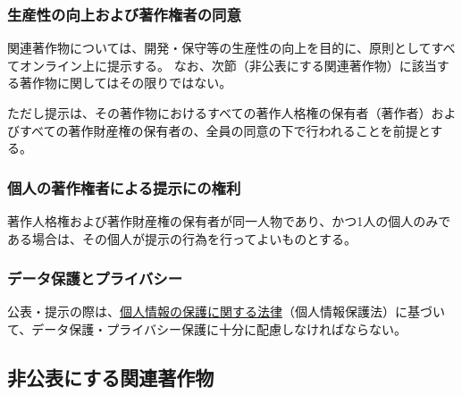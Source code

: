 \subsubsection{生産性の向上および著作権者の同意}
関連著作物については、開発・保守等の生産性の向上を目的に、原則としてすべてオンライン上に提示する。
なお、次節（非公表にする関連著作物）に該当する著作物に関してはその限りではない。

ただし提示は、その著作物におけるすべての著作人格権の保有者（著作者）およびすべての著作財産権の保有者の、全員の同意の下で行われることを前提とする。


\subsubsection{個人の著作権者による提示にの権利\label{subsec:individualright}}
著作人格権および著作財産権の保有者が同一人物であり、かつ1人の個人のみである場合は、その個人が提示の行為を行ってよいものとする。

\subsubsection{データ保護とプライバシー}
公表・提示の際は、\href{https://elaws.e-gov.go.jp/document?lawid=415AC0000000057}{個人情報の保護に関する法律}（個人情報保護法）\cite{online:eGovPersonalInfoProtectionLaw}に基づいて、データ保護・プライバシー保護に十分に配慮しなければならない。


\subsection{非公表にする関連著作物}

